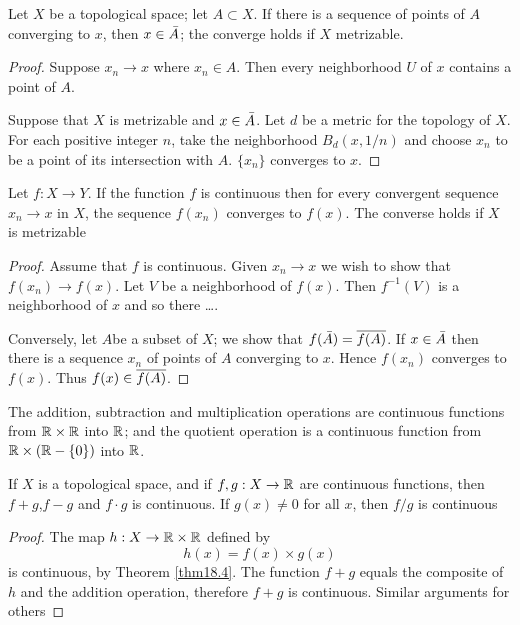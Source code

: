 \documentclass[11pt]{article}
\begin{document}
\begin{lemma}
Let \(X\) be a topological space; let \(A\subset X\). If there is a sequence of points of \(A\)
converging to \(x\), then \(x\in\bar{A}\); the converge holds if \(X\) metrizable.
\end{lemma}

\begin{proof}
Suppose \(x_n\to x\) where \(x_n\in A\). Then every neighborhood \(U\) of \(x\) contains a point
of \(A\).

Suppose that \(X\) is metrizable and \(x\in\bar{A}\).  Let \(d\) be a metric for the topology
of \(X\). For each positive integer \(n\), take the neighborhood \(B_d(x,1/n)\) and
choose \(x_n\) to be a point of its intersection with \(A\). \(\{x_n\}\) converges to \(x\).
\end{proof}

\begin{theorem}[]
Let \(f:X\to Y\). If the function \(f\) is continuous then for every convergent sequence \(x_n\to x\)
in \(X\), the sequence \(f(x_n)\) converges to \(f(x)\). The converse holds if \(X\) is
metrizable
\end{theorem}

\begin{proof}
Assume that \(f\) is continuous. Given \(x_n\to x\) we wish to show that \(f(x_n)\to f(x)\).
Let \(V\) be a neighborhood of \(f(x)\). Then \(f^{-1}(V)\) is a neighborhood of \(x\) and so
there \ldots{}.

Conversely, let \(A\)be a subset of \(X\); we show that \(f(\bar{A})=\overline{f(A)}\). If \(x\in\bar{A}\)
then there is a sequence \(x_n\) of points of \(A\) converging to \(x\). Hence \(f(x_n)\)
converges to \(f(x)\). Thus \(f(x)\in\overline{f(A)}\).
\end{proof}

\begin{lemma}[]
The addition, subtraction and multiplication operations are continuous functions from \(\mathbb{R}\times\mathbb{R}\)
into \(\mathbb{R}\); and the quotient operation is a continuous function from \(\mathbb{R}\times(\mathbb{R}-\{0\})\) into \(\mathbb{R}\).
\end{lemma}

\begin{theorem}[]
If \(X\) is a topological space, and if \(f,g:X\to\mathbb{R}\) are continuous functions,
then \(f+g\),\(f-g\) and \(f\cdot g\) is continuous. If \(g(x)\neq0\) for all \(x\), then \(f/g\) is continuous
\end{theorem}

\begin{proof}
The map \(h:X\to\mathbb{R}\times\mathbb{R}\) defined by
\begin{equation*}
h(x)=f(x)\times g(x)
\end{equation*}
is continuous, by Theorem \ref{thm18.4}. The function \(f+g\) equals the composite of \(h\) and the
addition operation, therefore \(f+g\) is continuous. Similar arguments for others
\end{proof}
\end{document}

